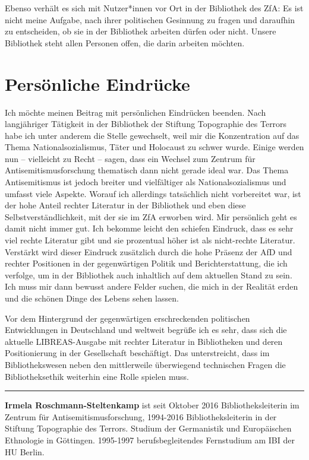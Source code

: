 \documentclass[a4paper,
fontsize=11pt,
oneside,
numbers=noperiodatend,
parskip=half-,
bibliography=totoc,
final
]{scrartcl}
\begin{document}
Ebenso verhält es sich mit Nutzer*innen vor Ort in der Bibliothek des
ZfA: Es ist nicht meine Aufgabe, nach ihrer politischen Gesinnung zu
fragen und daraufhin zu entscheiden, ob sie in der Bibliothek arbeiten
dürfen oder nicht. Unsere Bibliothek steht allen Personen offen, die
darin arbeiten möchten.

\hypertarget{persuxf6nliche-eindruxfccke}{%
\section*{Persönliche
Eindrücke}\label{persuxf6nliche-eindruxfccke}}

Ich möchte meinen Beitrag mit persönlichen Eindrücken beenden. Nach
langjähriger Tätigkeit in der Bibliothek der Stiftung Topographie des
Terrors habe ich unter anderem die Stelle gewechselt, weil mir die
Konzentration auf das Thema Nationalsozialismus, Täter und Holocaust zu
schwer wurde. Einige werden nun -- vielleicht zu Recht -- sagen, dass
ein Wechsel zum Zentrum für Antisemitismusforschung thematisch dann
nicht gerade ideal war. Das Thema Antisemitismus ist jedoch breiter und
vielfältiger als Nationalsozialismus und umfasst viele Aspekte. Worauf
ich allerdings tatsächlich nicht vorbereitet war, ist der hohe Anteil
rechter Literatur in der Bibliothek und eben diese
Selbstverständlichkeit, mit der sie im ZfA erworben wird. Mir persönlich
geht es damit nicht immer gut. Ich bekomme leicht den schiefen Eindruck,
dass es sehr viel rechte Literatur gibt und sie prozentual höher ist als
nicht-rechte Literatur. Verstärkt wird dieser Eindruck zusätzlich durch
die hohe Präsenz der AfD und rechter Positionen in der gegenwärtigen
Politik und Berichterstattung, die ich verfolge, um in der Bibliothek
auch inhaltlich auf dem aktuellen Stand zu sein. Ich muss mir dann
bewusst andere Felder suchen, die mich in der Realität erden und die
schönen Dinge des Lebens sehen lassen.

Vor dem Hintergrund der gegenwärtigen erschreckenden politischen
Entwicklungen in Deutschland und weltweit begrüße ich es sehr, dass sich
die aktuelle LIBREAS-Ausgabe mit rechter Literatur in Bibliotheken und
deren Positionierung in der Gesellschaft beschäftigt. Das unterstreicht,
dass im Bibliothekswesen neben den mittlerweile überwiegend technischen
Fragen die Bibliotheksethik weiterhin eine Rolle spielen muss.

\begin{center}\rule{0.5\linewidth}{\linethickness}\end{center}

\textbf{Irmela Roschmann-Steltenkamp} ist seit Oktober 2016
Bibliotheksleiterin im Zentrum für Antisemitismusforschung, 1994-2016
Bibliotheksleiterin in der Stiftung Topographie des Terrors. Studium der
Germanistik und Europäischen Ethnologie in Göttingen. 1995-1997
berufsbegleitendes Fernstudium am IBI der HU Berlin.
\end{document}

